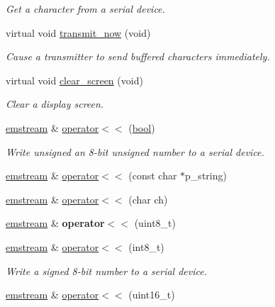 \begin{DoxyCompactItemize}
\begin{DoxyCompactList}\small\item\em Get a character from a serial device. \end{DoxyCompactList}\item 
virtual void \mbox{\hyperlink{classemstream_a3ef6ddf641176d416f9ae6a5c4cfc067}{transmit\+\_\+now}} (void)
\begin{DoxyCompactList}\small\item\em Cause a transmitter to send buffered characters immediately. \end{DoxyCompactList}\item 
virtual void \mbox{\hyperlink{classemstream_a8dcff85fe80c250b20b5da78b1799ed5}{clear\+\_\+screen}} (void)
\begin{DoxyCompactList}\small\item\em Clear a display screen. \end{DoxyCompactList}\item 
\mbox{\hyperlink{classemstream}{emstream}} \& \mbox{\hyperlink{classemstream_a180fa065e30c2e97e957a97b70eb8eb4}{operator$<$$<$}} (\mbox{\hyperlink{group___motor___boolean___type_ga0ecf26b576b9a54eca656b9be7ba6a06}{bool}})
\begin{DoxyCompactList}\small\item\em Write unsigned an 8-\/bit unsigned number to a serial device. \end{DoxyCompactList}\item 
\mbox{\hyperlink{classemstream}{emstream}} \& \mbox{\hyperlink{classemstream_ac570021b41b465fd0f98257a17316e7b}{operator$<$$<$}} (const char $\ast$p\+\_\+string)
\item 
\mbox{\hyperlink{classemstream}{emstream}} \& \mbox{\hyperlink{classemstream_a2125b913b6a300c4ac176af247ff5a53}{operator$<$$<$}} (char ch)
\item 
\mbox{\label{classemstream_a28fcc39c98ff38302cba6b3eb98b66f0}} 
\mbox{\hyperlink{classemstream}{emstream}} \& {\bfseries operator$<$$<$} (uint8\+\_\+t)
\item 
\mbox{\hyperlink{classemstream}{emstream}} \& \mbox{\hyperlink{classemstream_a8666557b0248286fd70a69d6e0106f4f}{operator$<$$<$}} (int8\+\_\+t)
\begin{DoxyCompactList}\small\item\em Write a signed 8-\/bit number to a serial device. \end{DoxyCompactList}\item 
\mbox{\hyperlink{classemstream}{emstream}} \& \mbox{\hyperlink{classemstream_aed40605be053b7cbae14201162028781}{operator$<$$<$}} (uint16\+\_\+t)

\end{DoxyCompactItemize}
